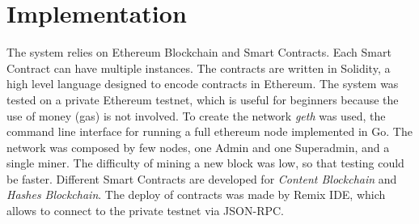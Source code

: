 \documentclass[hidelinks,conference,compsoc]{IEEEtran}
\begin{document}
\section{Implementation}
\label{Implementation}
The system relies on Ethereum Blockchain and Smart Contracts. Each Smart Contract can have multiple instances. 
The contracts are written in Solidity, a high level language designed to encode contracts in Ethereum. The system was tested on a private Ethereum testnet, which is useful for beginners because the use of money (gas) is not involved. To create the network \textit{geth} was used, the command line interface for running a full ethereum node implemented in Go. The network was composed by few nodes, one Admin and one Superadmin, and a single miner. The difficulty of mining a new block was low, so that testing could be faster.
Different Smart Contracts are developed for \textit{Content Blockchain} and \textit{Hashes Blockchain}. The deploy of contracts was made by Remix IDE, which allows to connect to the private testnet via JSON-RPC. 
\end{document}
